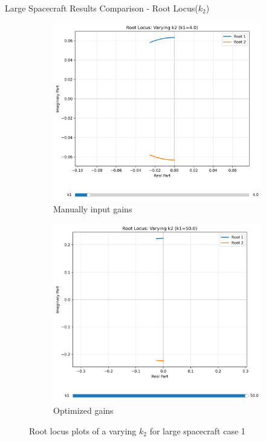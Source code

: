 \documentclass{beamer}
\begin{document}
\begin{frame}{Large Spacecraft Results Comparison - Root Locus($k_2$)}
    \begin{figure}[H]
    \label{Fig. 1}
    \centering
    \begin{subfigure}[b]{0.48\columnwidth}
        \label{Fig. 1.A}
        \centering
        \includegraphics[width=\linewidth]{base_k2_root_locus(1).pdf}
        \caption{Manually input gains}
        \label{fig:subfig1}
    \end{subfigure}
    \hfill
    \begin{subfigure}[b]{0.48\columnwidth}
        \label{Fig. 1.B}
        \centering
        \includegraphics[width=\linewidth]{best_k2_root_locus(1).pdf}
        \caption{Optimized gains}
        \label{fig:subfig2}
    \end{subfigure}
    \caption{Root locus plots of a varying $k_2$ for large spacecraft case 1}
    \label{fig:combined}
\end{figure}
\end{frame}
\end{document}
